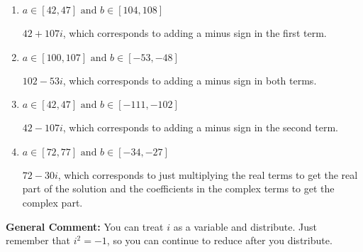 \documentclass{extbook}[14pt]
\begin{document}
\begin{enumerate}
{\begin{enumerate}[label=\Alph*.]
* $102 + 53 i$, which is the correct option.
\item \( a \in [42, 47] \text{ and } b \in [104, 108] \)

 $42 + 107 i$, which corresponds to adding a minus sign in the first term.
\item \( a \in [100, 107] \text{ and } b \in [-53, -48] \)

 $102 - 53 i$, which corresponds to adding a minus sign in both terms.
\item \( a \in [42, 47] \text{ and } b \in [-111, -102] \)

 $42 - 107 i$, which corresponds to adding a minus sign in the second term.
\item \( a \in [72, 77] \text{ and } b \in [-34, -27] \)

 $72 - 30 i$, which corresponds to just multiplying the real terms to get the real part of the solution and the coefficients in the complex terms to get the complex part.
\end{enumerate}

\textbf{General Comment:} You can treat $i$ as a variable and distribute. Just remember that $i^2=-1$, so you can continue to reduce after you distribute.
}
\end{enumerate}
\end{document}
